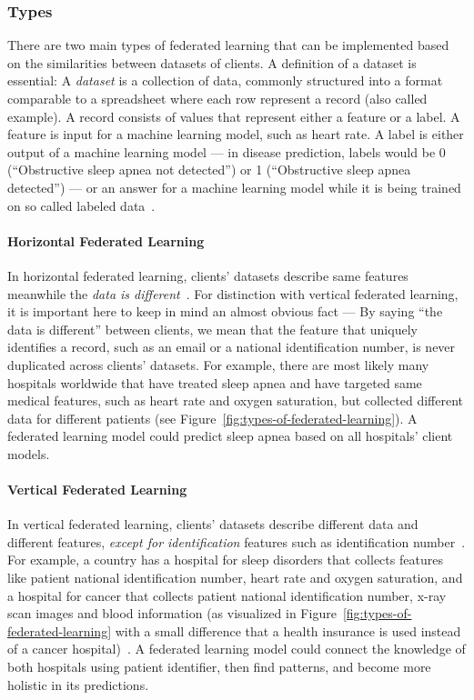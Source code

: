 \subsubsection{Types}
There are two main types of federated learning that can be implemented based on the similarities between datasets of clients. A definition of a dataset is essential: A \emph{dataset} is a collection of data, commonly structured into a format comparable to a spreadsheet where each row represent a record (also called example). A record consists of values that represent either a feature or a label. A feature is input for a machine learning model, such as heart rate. A label is either output of a machine learning model --- in disease prediction, labels would be 0 (``Obstructive sleep apnea not detected'') or 1 (``Obstructive sleep apnea detected'') --- or an answer for a machine learning model while it is being trained on so called labeled data~\cite{MachineLearningGlossary}.

\paragraph{Horizontal Federated Learning} In horizontal federated learning, clients' datasets describe same features meanwhile the \emph{data is different}~\cite{prayitnoSystematicReviewFederated2021, zhangIntroductionFederatedLearning2022, FederatedLearningWhat, strykerWhatFederatedLearning2025a}. For distinction with vertical federated learning, it is important here to keep in mind an almost obvious fact --- By saying ``the data is different'' between clients, we mean that the feature that uniquely identifies a record, such as an email or a national identification number, is never duplicated across clients' datasets.   For example, there are most likely many hospitals worldwide that have treated sleep apnea and have targeted same medical features, such as heart rate and oxygen saturation, but collected different data for different patients (see Figure~\ref{fig:types-of-federated-learning}). A federated learning model could predict sleep apnea based on all hospitals' client models.

\paragraph{Vertical Federated Learning} In vertical federated learning, clients' datasets describe different data and different features, \emph{except for identification} features such as identification number~\cite{prayitnoSystematicReviewFederated2021, zhangIntroductionFederatedLearning2022, FederatedLearningWhat, strykerWhatFederatedLearning2025a}. For example, a country has a hospital for sleep disorders that collects features like patient national identification number, heart rate and oxygen saturation, and a hospital for cancer that collects patient national identification number, x-ray scan images and blood information (as visualized in Figure~\ref{fig:types-of-federated-learning} with a small difference that a health insurance is used instead of a cancer hospital)~\cite{shiVerticalFederatedLearning2025}. A federated learning model could connect the knowledge of both hospitals using patient identifier, then find patterns, and become more holistic in its predictions.

